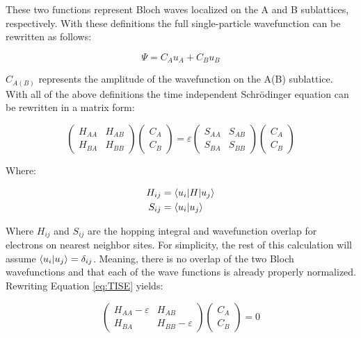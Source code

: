 These two functions represent Bloch waves localized on the A and B sublattices, respectively. With these definitions the full single-particle wavefunction can be rewritten as follows:

\begin{equation}
    \Psi = C_A u_A + C_B u_B
\end{equation}

$C_{A(B)}$ represents the amplitude of the wavefunction on the A(B) sublattice. With all of the above definitions the time independent Schr\"{o}dinger equation can be rewritten in a matrix form:

\begin{equation} 
\label{eq:TISE}
    \begin{pmatrix} H_{AA} & H_{AB} \\ H_{BA} & H_{BB} \end{pmatrix} \begin{pmatrix} C_A \\ C_B \end{pmatrix} = \varepsilon \begin{pmatrix} S_{AA} & S_{AB} \\ S_{BA} & S_{BB} \end{pmatrix} \begin{pmatrix} C_A \\ C_B \end{pmatrix}
\end{equation}

Where:

\begin{align}
\label{eq:matel}
    H_{ij} &= \braket{u_i | H | u_j} \\
    S_{ij} &= \braket{u_i | u_j}
\end{align}

Where $H_{ij}$ and $S_{ij}$ are the hopping integral and wavefunction overlap for electrons on nearest neighbor sites. For simplicity, the rest of this calculation will assume $\braket{u_i | u_j} = \delta_{ij}$. Meaning, there is no overlap of the two Bloch wavefunctions and that each of the wave functions is already properly normalized. Rewriting Equation \ref{eq:TISE} yields:

\begin{equation}
\label{eq:secular}
    \begin{pmatrix} H_{AA}-\varepsilon & H_{AB} \\ H_{BA} & H_{BB}-\varepsilon \end{pmatrix} \begin{pmatrix} C_A \\ C_B \end{pmatrix} = 0
\end{equation}

